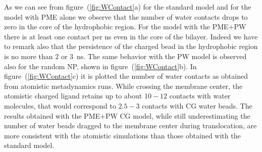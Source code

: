 As we can see from figure~(\ref{fig:WContact}a) for the standard \martini model and for the model with \ac{PME} alone we observe that the number of water contacts drops to zero in the core of the hydrophobic region. For the model with the \ac{PME}+\ac{PW} there is at least one contact per ns even in the core of the bilayer. Indeed we have to remark also that the persistence of the charged bead in the hydrophobic region is no more than $2$ or $3$~ns. The same behavior with the \ac{PW} model is observed also for the random \ac{NP}, shown in figure~(\ref{fig:WContact}b). In figure~(\ref{fig:WContact}c) it is plotted the number of water contacts as obtained from atomistic metadynamics runs. While crossing the membrane center, the atomistic charged ligand retains up to about $10-12$ contacts with water molecules, that would correspond to $2.5-3$ contacts with \martini \ac{CG} water beads. The results obtained with the \ac{PME}$+$\ac{PW} \ac{CG} model, while still underestimating the number of water beads dragged to the membrane center during translocation, are more consistent with the atomistic simulations than those obtained with the standard \martini model.

